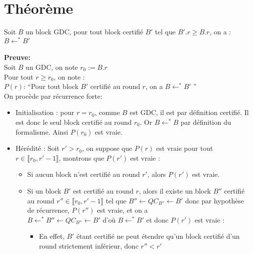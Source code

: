 \documentclass{article}
\begin{document}
\section*{Théorème}
Soit \(B\) un block GDC, pour tout block certifié \(B'\) tel que \(B'.r \geq B.r\), on a : \(B \leftarrow^* B'\)
\\
\\
\textbf{Preuve:}\\
Soit \(B\) un GDC, on note \(r_0 := B.r\)\\
Pour tout \(r \geq r_0\), on note :\\ \(P(r)\): ``Pour tout block \(B'\) certifié au round \(r\), on a \(B \leftarrow^* B'\) ''\\
On procède par récurrence forte:
\begin{itemize}
        \item Initialisation : pour \(r = r_0\), comme \(B\) est GDC, il est par définition certifié. Il est donc le seul block certifié au round \(r_0\). Or \(B \leftarrow^* B\) par définition du formalisme. Ainsi \(P(r_0)\) est vraie.
        \item Hérédité : Soit \(r' > r_0\), on suppose que \(P(r)\) est vraie pour tout\\ \(r \in \llbracket r_0, r'-1 \rrbracket\), montrons que \(P(r')\) est vraie :
            \begin{itemize}
                \item Si aucun block n'est certifié au round \(r'\), alors \(P(r')\) est vraie.
                \item Si un block \(B'\) est certifié au round \(r\), alors il existe un block \(B''\) certifié au round \(r''\in\llbracket r_0, r'-1 \rrbracket\) tel que \(B'' \leftarrow QC_{B''} \leftarrow B'\) donc par hypothèse de récurrence, \(P(r'')\) est vraie, et on a \\ \(B \leftarrow^* B'' \leftarrow QC_{B''} \leftarrow B'\) d'où \(B \leftarrow^* B'\) et donc \(P(r')\) est vraie :
                \begin{itemize}
                    \item En effet, \(B'\) étant certifié ne peut étendre qu'un block certifié d'un round strictement inférieur, donc \(r'' < r'\)

\end{itemize}
\end{itemize}
\end{itemize}
\end{document}
